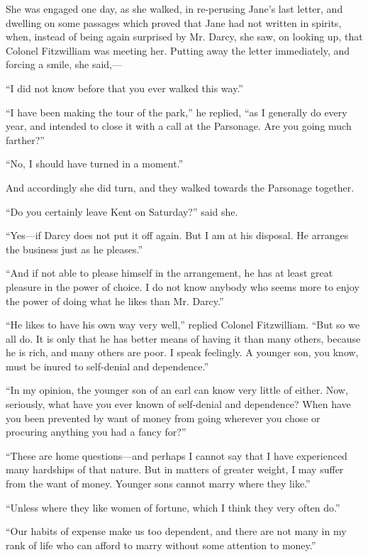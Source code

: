 \documentclass[10pt]{book}
\begin{document}
   She was engaged one day, as she walked, in re-perusing Jane’s last
letter, and dwelling on some passages which proved that Jane had not
written in spirits, when, instead of being again surprised by Mr. Darcy,
she saw, on looking up, that Colonel Fitzwilliam was meeting her.
Putting away the letter immediately, and forcing a smile, she said,—
  

   “I did not know before that you ever walked this way.”
  

   “I have been making the tour of the park,” he replied, “as I generally
do every year, and intended to close it with a call at the Parsonage.
Are you going much farther?”
  

   “No, I should have turned in a moment.”
  

   And accordingly she did turn, and they walked towards the Parsonage
together.
  

   “Do you certainly leave Kent on Saturday?” said she.
  

   “Yes—if Darcy does not put it off again. But I am at his disposal. He
arranges the business just as he pleases.”
  

   “And if not able to please himself in the arrangement, he has at least
great pleasure in the power of choice. I
   do not know anybody who seems
more to enjoy the power of doing what he likes than Mr. Darcy.”
  

   “He likes to have his own way very well,” replied Colonel Fitzwilliam.
“But so we all do. It is only that he has better means of having it than
many others, because he is rich, and many others are poor. I speak
feelingly. A younger son, you know, must be inured to self-denial and
dependence.”
  

   “In my opinion, the younger son of an earl can know very little of
either. Now, seriously, what have you ever known of self-denial and
dependence? When have you been prevented by want of money from going
wherever you chose or procuring anything you had a fancy for?”
  

   “These are home questions—and perhaps I cannot say that I have
experienced many hardships of that nature. But in matters of greater
weight, I may suffer from the want of money. Younger sons cannot marry
where they like.”
  

   “Unless where they like women of fortune, which I think they very often
do.”
  

   “Our habits of expense make us too dependent, and there are not many in
my rank of life who can afford to marry without some attention to
money.”
  
\end{document}
